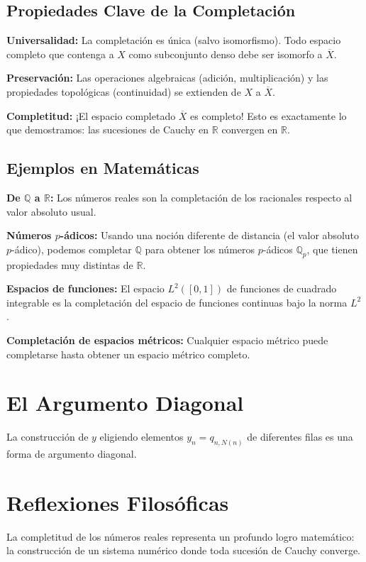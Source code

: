 \subsection{Propiedades Clave de la Completación}

\textbf{Universalidad:} La completación es única (salvo isomorfismo). Todo espacio
completo que contenga a $X$ como subconjunto denso debe ser isomorfo a
$\overline{X}$.

\textbf{Preservación:} Las operaciones algebraicas (adición, multiplicación) y las
propiedades topológicas (continuidad) se extienden de $X$ a $\overline{X}$.

\textbf{Completitud:} ¡El espacio completado $\overline{X}$ es completo! Esto es
exactamente lo que demostramos: las sucesiones de Cauchy en $\mathbb{R}$ convergen
en $\mathbb{R}$.

\subsection{Ejemplos en Matemáticas}

\textbf{De $\mathbb{Q}$ a $\mathbb{R}$:} Los números reales son la completación de
los racionales respecto al valor absoluto usual.

\textbf{Números $p$-ádicos:} Usando una noción diferente de distancia (el valor
absoluto $p$-ádico), podemos completar $\mathbb{Q}$ para obtener los números
$p$-ádicos $\mathbb{Q}_p$, que tienen propiedades muy distintas de $\mathbb{R}$.

\textbf{Espacios de funciones:} El espacio $L^2([0,1])$ de funciones de cuadrado
integrable es la completación del espacio de funciones continuas bajo la norma
$L^2$.

\textbf{Completación de espacios métricos:} Cualquier espacio métrico puede
completarse hasta obtener un espacio métrico completo.

\section{El Argumento Diagonal}

La construcción de $y$ eligiendo elementos $y_n = q_{n,N(n)}$ de diferentes filas
es una forma de argumento diagonal.

\section{Reflexiones Filosóficas}

La completitud de los números reales representa un profundo logro matemático: la
construcción de un sistema numérico donde toda sucesión de Cauchy converge.

